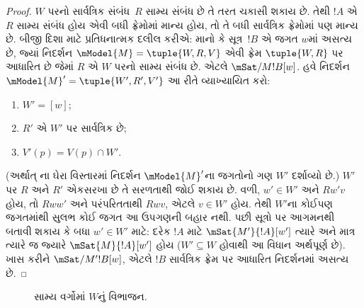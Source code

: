 \begin{proof}
  $W$ પરનો સાર્વત્રિક સંબંધ~$R$ સામ્ય સંબંધ છે
  તે તરત ચકાસી શકાય છે. તેથી $!A$ એ $R$ સામ્ય
  સંબંધ હોય એવી બધી ફ્રેમોમાં માન્ય હોય, તો તે
  બધી સાર્વત્રિક ફ્રેમોમાં પણ માન્ય છે. બીજી
  દિશા માટે પ્રતિધનાત્મક દલીલ કરીએ: માનો કે
  સૂત્ર~$!B$ એ જગત $w$માં અસત્ય છે,
  જ્યાં નિદર્શન $\mModel{M} = \tuple{W, R, V}$
  એવી ફ્રેમ $\tuple{W,R}$ પર આધારિત છે જેમાં $R$
  એ $W$ પરનો સામ્ય સંબંધ છે. એટલે
  $\mSat/{M}{!B}[w]$. હવે નિદર્શન
  $\mModel{M}' = \tuple{W',
    R', V'}$ આ રીતે વ્યાખ્યાયિત કરો:
  \begin{enumerate}
  \item $W' = [w]$;
  \item $R'$ એ $W'$ પર સાર્વત્રિક છે;
  \item $V'(p) = V(p) \cap W'$.
  \end{enumerate}
  (અર્થાત્ ના ઘેરા વિસ્તારમાં
  નિદર્શન $\mModel{M}'$ના જગતોનો ગણ $W'$
  દર્શાવ્યો છે.) $W'$ પર $R$ અને $R'$ એકસરખા
  છે તે સરળતાથી જોઈ શકાય છે. વળી, $w'\in W'$ અને
  $Rw'v$ હોય, તો $Rww'$ અને પરંપરિતતાથી $Rwv$,
  એટલે $v\in W'$ હોય. તેથી $W'$ના કોઈપણ જગતમાંથી
  સુલભ કોઈ જગત આ ઉપગણની બહાર નથી. પછી સૂત્રો
  પર આગમનથી બતાવી શકાય કે બધા $w' \in W'$ માટે:
  દરેક $!A$ માટે $\mSat{M'}{!A}[w']$ ત્યારે અને
  માત્ર ત્યારે જ જ્યારે $\mSat{M}{!A}[w']$ હોય
  ($W'
  \subseteq W$ હોવાથી આ વિધાન અર્થપૂર્ણ છે).
  ખાસ કરીને $\mSat/{M'}{!B}[w]$, એટલે $!B$
  સાર્વત્રિક ફ્રેમ પર આધારિત નિદર્શનમાં અસત્ય છે.
\end{proof}

\begin{figure}[t]
  \centering
  \caption{સામ્ય વર્ગોમાં $W$નું વિભાજન.}
\end{figure}
\endgroup

